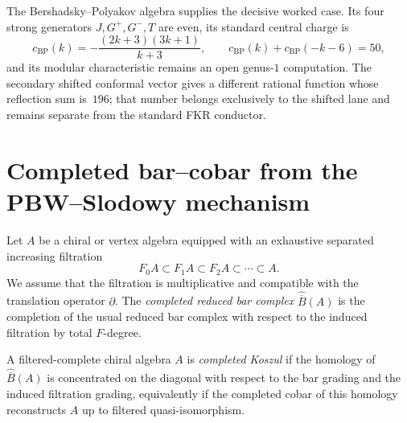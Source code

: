 The Bershadsky--Polyakov algebra supplies the decisive worked case.  Its
four strong generators $J,G^+,G^-,T$ are even, its standard central charge is
\[
c_{\mathrm{BP}}(k)
=-\frac{(2k+3)(3k+1)}{k+3},
\qquad
c_{\mathrm{BP}}(k)+c_{\mathrm{BP}}(-k-6)=50,
\]
and its modular characteristic remains an open genus-$1$ computation.  The
secondary shifted conformal vector gives a different rational function whose
reflection sum is~$196$; that number belongs exclusively to the shifted lane
and remains separate from the standard FKR conductor.

\section{Completed bar--cobar from the PBW--Slodowy mechanism}

\begin{definition}
Let $A$ be a chiral or vertex algebra equipped with an exhaustive separated
increasing filtration
\[
F_0A \subset F_1A \subset F_2A \subset \cdots \subset A.
\]
We assume that the filtration is multiplicative and compatible with the
translation operator $\partial$. The \emph{completed reduced bar complex}
$\widehat{\overline B}(A)$ is the completion of the usual reduced bar complex
with respect to the induced filtration by total $F$-degree.
\end{definition}

\begin{definition}
A filtered-complete chiral algebra $A$ is \emph{completed Koszul} if the
homology of $\widehat{\overline B}(A)$ is concentrated on the diagonal with
respect to the bar grading and the induced filtration grading, equivalently if
the completed cobar of this homology reconstructs $A$ up to filtered
quasi-isomorphism.
\end{definition}

